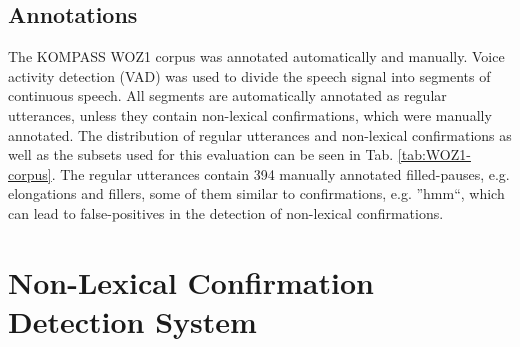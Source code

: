 \documentclass[letterpaper]{article}
\begin{document}
\subsection{Annotations}
The KOMPASS WOZ1 corpus was annotated automatically and manually. Voice activity detection (VAD) was used to divide the speech signal into segments of continuous speech. 
All segments are automatically annotated as regular utterances, unless they contain non-lexical confirmations, which were manually annotated. The distribution of regular utterances and non-lexical confirmations as well as the subsets used for this evaluation can be seen in Tab. \ref{tab:WOZ1-corpus}. 
The regular utterances contain 394 manually annotated filled-pauses, e.g. elongations and fillers, some of them similar to confirmations, e.g. ''hmm``, which can lead to false-positives in the detection of non-lexical confirmations. 
\begin{table}[t]
	\caption{WOZ1 corpus segment distribution and used subsets for training with cross-validation and testing}
	\label{tab:WOZ1-corpus}
\end{table}
\section{Non-Lexical Confirmation Detection System}
\end{document}
